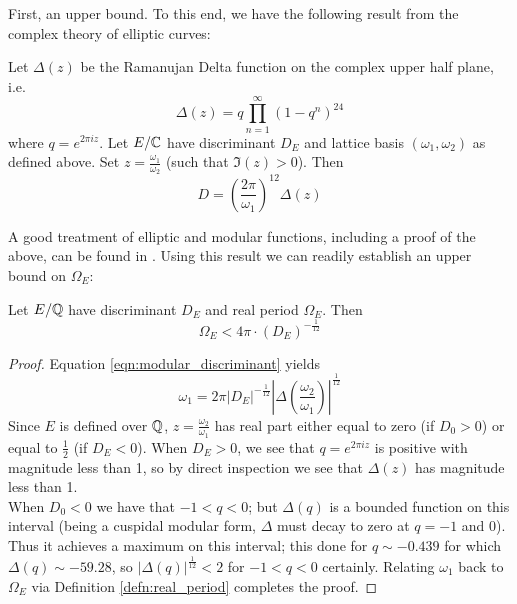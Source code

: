 \documentclass[10pt]{article}
\begin{document}
First, an upper bound. To this end, we have the following result from the complex theory of elliptic curves:
\begin{proposition}
Let $\Delta(z)$ be the Ramanujan Delta function on the complex upper half plane, i.e.
\begin{equation}
\Delta(z) = q \prod_{n=1}^{\infty} (1-q^n)^{24}
\end{equation}
where $q = e^{2\pi i z}$. Let $E/\mathbb{C}$ have discriminant $D_E$ and lattice basis $(\omega_1,\omega_2)$ as defined above. Set $z = \frac{\omega_1}{\omega_2}$ (such that $\Im(z) > 0$). Then
\begin{equation}\label{eqn:modular_discriminant}
D = \left(\frac{2\pi}{\omega_1}\right)^{12} \Delta\left(z \right)
\end{equation}
\end{proposition}
A good treatment of elliptic and modular functions, including a proof of the above, can be found in \cite{Sil-1994}. Using this result we can readily establish an upper bound on $\Omega_E$:
\begin{proposition}\label{prop:real_period_upper_bound_discriminant}
Let $E/\mathbb{Q}$ have discriminant $D_E$ and real period $\Omega_E$. Then
\begin{equation}
\Omega_E < 4\pi \cdot (D_E)^{-\frac{1}{12}}
\end{equation}
\end{proposition}
\begin{proof}
Equation \ref{eqn:modular_discriminant} yields
\begin{equation}
\omega_1 = 2\pi |D_E|^{-\frac{1}{12}} \left| \Delta\left(\frac{\omega_2}{\omega_1}\right)\right|^{\frac{1}{12}}
\end{equation}
Since $E$ is defined over $\mathbb{Q}$, $z = \frac{\omega_2}{\omega_1}$ has real part either equal to zero (if $D_0>0$) or equal to $\frac{1}{2}$ (if $D_E<0$). When $D_E>0$, we see that $q = e^{2\pi i z}$ is positive with magnitude less than 1, so by direct inspection we see that $\Delta(z)$ has magnitude less than 1. \\

When $D_0<0$ we have that $-1<q<0$; but $\Delta(q)$ is a bounded function on this interval (being a cuspidal modular form, $\Delta$ must decay to zero at $q = -1$ and $0$). Thus it achieves a maximum on this interval; this done for $q \sim -0.439$ for which $\Delta(q) \sim -59.28$, so $|\Delta(q)|^{\frac{1}{12}} < 2$ for $-1<q<0$ certainly. Relating $\omega_1$ back to $\Omega_E$ via Definition \ref{defn:real_period} completes the proof.
\end{proof}
\end{document}
